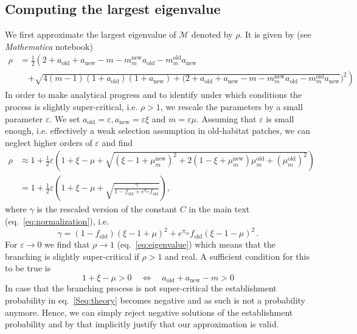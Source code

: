 \documentclass[11pt]{article}
\newcommand{\chg}[1]{\textcolor{change}{#1}}
\begin{document}
\subsection{Computing the largest eigenvalue}
We first approximate the largest eigenvalue of $\mathcal{M}$ denoted by $\rho$. It is given by (see \textit{Mathematica} notebook)
\begin{equation}
\begin{aligned}
\rho &= \frac{1}{2}\left(2 + a_{\text{old}} + a_{\text{new}} - m -  m_m^{\text{new}} a_{\text{old}} - m_m^{\text{old}} a_{\text{new}} \right.\\
&\quad \left. + \sqrt{4 (m -1) (1+a_{\text{old}})(1+a_{\text{new}}) + (2+a_{\text{old}} + a_{\text{new}} - m - m_m^{\text{new}} a_{\text{old}} - m_m^{\text{old}} a_{\text{new}}})^2 \right)
\end{aligned}
\end{equation}
%
In order to make analytical progress and to identify under which conditions the process is slightly super-critical, i.e. $\rho>1$, we rescale the parameters by a small parameter $\varepsilon$. We set $a_{\text{old}} = \varepsilon, a_{\text{new}} = \varepsilon \xi$ and $m = \varepsilon\mu$. Assuming that $\varepsilon$ is small enough, i.e. effectively a weak selection assumption in old-habitat patches, we can neglect higher orders of $\varepsilon$ and find
\begin{equation}\label{eq:eigenvalue}
\begin{aligned}
\rho &\approx 1+\frac{1}{2}\varepsilon\left(1+ \xi - \mu + \sqrt{(\xi -1 + \mu_m^{\text{new}})^2 + 2(1-\xi+\mu_m^{\text{new}})\mu_m^{\text{old}} + (\mu_m^{\text{old}})^2  }\right)\\
&= 1+\frac{1}{2}\varepsilon\left(1+ \xi - \mu + \sqrt{\frac{\gamma}{1-f_{\text{old}}+ e^{\pi_m} f_{\text{old}}}  }\right),
\end{aligned}
\end{equation}
where $\gamma$ is the rescaled version of the constant $C$ in the main text (eq.~\eqref{eq:normalization}), i.e.
\begin{equation}
\gamma = (1-f_{\text{old}})(\xi-1+\mu)^2 +  e^{\pi_m} f_{\text{old}} (\xi-1-\mu)^2\, .
\end{equation}
%
For $\varepsilon\to 0$ we find that $\rho\to 1$ \chg{(eq.~\eqref{eq:eigenvalue}) which means that the branching is slightly super-critical if $\rho>1$ and real. A sufficient condition for this to be true is}
\begin{equation}
1+\xi-\mu > 0 \quad \Leftrightarrow \quad a_{\text{old}} + a_{\text{new}} - m > 0
\end{equation}
%
\chg{In case that the branching process is not super-critical the establishment probability in eq.~\eqref{Seq:theory} becomes negative and as such is not a probability anymore. Hence, we can simply reject negative solutions of the establishment probability and by that implicitly justify that our approximation is valid.}%
\end{document}
